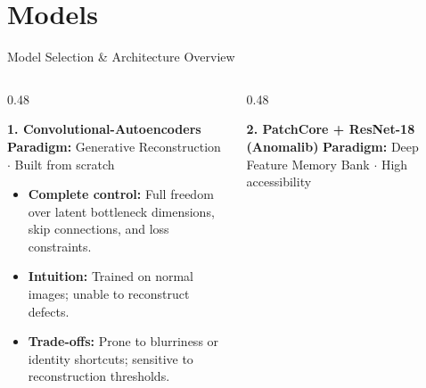 \documentclass[aspectratio=169,10pt]{beamer}
\begin{document}
\section{Models}

\begin{frame}{Model Selection \& Architecture Overview}
\vspace*{-0.2cm}
\begin{columns}[T, onlytextwidth]

  \begin{column}{0.48\textwidth}
    \begin{block}{\small\bfseries 1. Convolutional-Autoencoders}
      \vspace{2pt}
      {\tiny\color{muted}\textbf{Paradigm:} Generative Reconstruction $\cdot$ Built from scratch}\\[4pt]
      
      \centering
      \resizebox{0.95\linewidth}{!}{
        
      }
      \vspace{2pt}
    \end{block}

    \vspace{4pt}
    {\small
    \begin{itemize}\setlength{\itemsep}{2pt}\setlength{\leftskip}{-10pt}
      \item \textbf{Complete control:} Full freedom over latent bottleneck dimensions, skip connections, and loss constraints.
      \item \textbf{Intuition:} Trained on normal images; unable to reconstruct defects.
      \item \textbf{Trade-offs:} Prone to blurriness or identity shortcuts; sensitive to reconstruction thresholds.
    \end{itemize}
    }
  \end{column}

  \begin{column}{0.48\textwidth}
    \begin{block}{\small\bfseries 2. PatchCore + ResNet-18 (Anomalib)}
      \vspace{2pt}
      {\tiny\color{muted}\textbf{Paradigm:} Deep Feature Memory Bank $\cdot$ High accessibility}\\[4pt]
      

\end{block}
\end{column}
\end{columns}
\end{frame}
\end{document}
